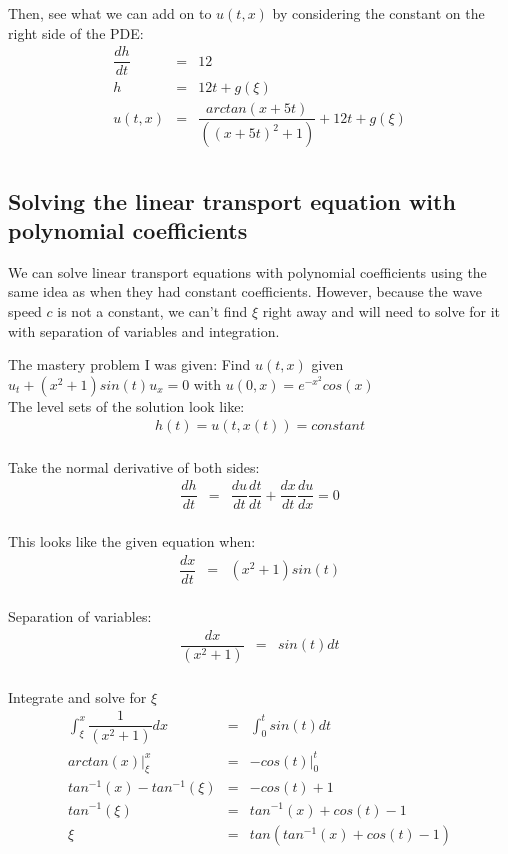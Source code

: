 \documentclass{article}
\newcommand{\bea}{\begin{eqnarray*}}
\newcommand{\eea}{\end{eqnarray*}}
\newcommand{\red}[1]{\textcolor{red}{#1}}
\begin{document}
Then, see what we can add on to $u(t,x)$ by considering the constant on the right side of the PDE:\\
\bea
\dfrac{dh}{dt} &=& 12 \\
h &=& 12t + g(\xi) \\ 
u(t,x) &=& \dfrac{arctan(x+5t)}{((x+5t)^2+1)} + 12t + g(\xi) \\
\eea



\subsection{Solving the linear transport equation with polynomial coefficients}
We can solve linear transport equations with polynomial coefficients using the same idea as when they had constant coefficients. However, because the wave speed $c$ is not a constant, we can't find $\xi$ right away and will need to solve for it with separation of variables and integration. \newline

The mastery problem I was given: Find $u(t,x)$ given $u_t+(x^2+1)sin(t)u_x=0$ with $u(0,x) = e^{-x^2}cos(x)$ \\

The level sets of the solution look like:
\bea
h(t) = u(t,x(t)) = constant\\
\eea

Take the normal derivative of both sides:
\bea
\dfrac{dh}{dt} &=& \dfrac{du}{dt}\dfrac{dt}{dt} + \dfrac{dx}{dt}\dfrac{du}{dx} = 0\\
\eea

This looks like the given equation when:
\bea
\dfrac{dx}{dt} &=& (x^2+1)sin(t) \\
\eea

Separation of variables:
\bea
\dfrac{dx}{(x^2+1)} &=& sin(t)dt \\
\eea

Integrate and solve for $\xi$
\bea
\int_{\xi}^{x} \dfrac{1}{(x^2+1)}dx &=& \int_{0}^{t} sin(t)dt\\
arctan(x)\Big|_\xi^x &=& -cos(t)\Big|_0^t\\
tan^{-1}(x)-tan^{-1}(\xi) &=& -cos(t) + 1\\
tan^{-1}(\xi) &=& tan^{-1}(x) + cos(t) - 1\\
\xi &=& tan(tan^{-1}(x) + cos(t) - 1)\\
\eea 
\end{document}
